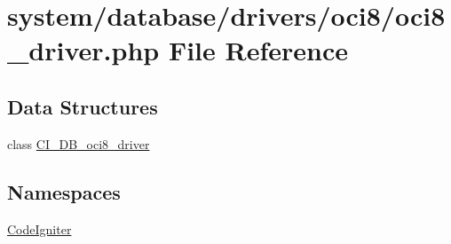 \hypertarget{oci8__driver_8php}{}\section{system/database/drivers/oci8/oci8\+\_\+driver.php File Reference}
\label{oci8__driver_8php}
\subsection*{Data Structures}
\begin{DoxyCompactItemize}
\item 
class \mbox{\hyperlink{class_c_i___d_b__oci8__driver}{C\+I\+\_\+\+D\+B\+\_\+oci8\+\_\+driver}}
\end{DoxyCompactItemize}
\subsection*{Namespaces}
\begin{DoxyCompactItemize}
\item 
 \mbox{\hyperlink{namespace_code_igniter}{Code\+Igniter}}
\end{DoxyCompactItemize}
